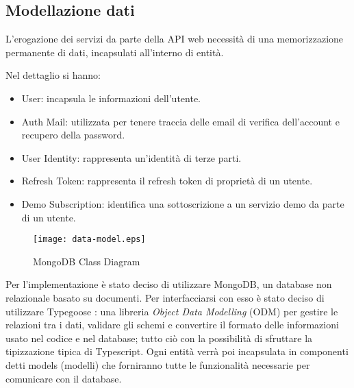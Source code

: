 \subsection{Modellazione dati}
L'erogazione dei servizi da parte della API web necessità di una memorizzazione permanente di dati, incapsulati all'interno di entità.

Nel dettaglio si hanno:
\begin{itemize}
    \itemsep0em
    \item User: incapsula le informazioni dell'utente.
    \item Auth Mail: utilizzata per tenere traccia delle email di verifica dell'account e recupero della password.
    \item User Identity: rappresenta un'identità di terze parti.
    \item Refresh Token: rappresenta il refresh token di proprietà di un utente.
    \item Demo Subscription: identifica una sottoscrizione a un servizio demo da parte di un utente.
\end{itemize}

\begin{figure}[h]
    \centering
    \texttt{[image: data-model.eps]}
    \caption{MongoDB Class Diagram}
    \label{fig:DataModel}
\end{figure}

Per l'implementazione è stato deciso di utilizzare MongoDB, un database non relazionale basato su documenti.
Per interfacciarsi con esso è stato deciso di utilizzare Typegoose \cite{Typegoose}: una libreria \textit{Object Data Modelling} (ODM) per gestire le relazioni tra i dati,
validare gli schemi e convertire il formato delle informazioni usato nel codice e nel database; tutto ciò con la possibilità di sfruttare la tipizzazione tipica di Typescript.
Ogni entità verrà poi incapsulata in componenti detti models (modelli) che forniranno tutte le funzionalità necessarie per comunicare con il database.
\newpage